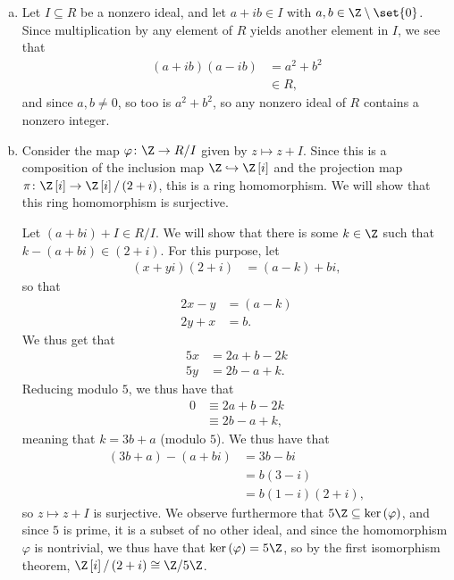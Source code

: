 \documentclass[10pt]{mypackage}
\begin{document}
\begin{solution}\hfill
  \begin{enumerate}[(a)]
    \item Let $I\subseteq R$ be a nonzero ideal, and let $a + ib\in I$ with $a,b\in \Z\setminus\set{0}$. Since multiplication by any element of $R$ yields another element in $I$, we see that
      \begin{align*}
        \left( a + ib \right)\left( a-ib \right) &= a^2 + b^2\\
                                                 &\in R,
      \end{align*}
      and since $a,b\neq 0$, so too is $a^2 + b^2$, so any nonzero ideal of $R$ contains a nonzero integer.
    \item Consider the map $\varphi\colon \Z\rightarrow R/I$ given by $z\mapsto z + I$. Since this is a composition of the inclusion map $\Z\hookrightarrow \Z\left[ i \right]$ and the projection map $\pi\colon \Z\left[ i \right]\rightarrow \Z\left[ i \right]/\left( 2+i \right)$, this is a ring homomorphism. We will show that this ring homomorphism is surjective.\newline

      Let $\left( a + bi \right) + I\in R/I$. We will show that there is some $k\in \Z$ such that $k - \left( a + bi \right) \in \left( 2 + i \right)$. For this purpose, let
      \begin{align*}
        \left( x + yi \right)\left( 2+i \right) &= \left( a-k \right) + bi,
      \end{align*}
      so that
      \begin{align*}
        2x - y &= \left( a-k \right)\\
        2y  + x &= b.
      \end{align*}
      We thus get that
      \begin{align*}
        5x &= 2a + b - 2k\\
        5y &= 2b - a + k.
      \end{align*}
      Reducing modulo $5$, we thus have that
      \begin{align*}
        0 &\equiv 2a + b - 2k\\
          &\equiv 2b - a + k,
      \end{align*}
      meaning that $k = 3b + a$ (modulo $5$). We thus have that
      \begin{align*}
        \left( 3b + a \right) - \left( a + bi \right) &= 3b - bi\\
                                                      &= b\left( 3-i \right)\\
                                                      &= b\left( 1-i \right)\left( 2+i \right),
      \end{align*}
      so $z\mapsto z + I$ is surjective. We observe furthermore that $5\Z\subseteq \ker\left( \varphi \right)$, and since $5$ is prime, it is a subset of no other ideal, and since the homomorphism $\varphi$ is nontrivial, we thus have that $\ker\left( \varphi \right) = 5\Z$, so by the first isomorphism theorem, $\Z\left[ i \right]/\left( 2+i \right) \cong \Z/5\Z$.
  \end{enumerate}
\end{solution}
\end{document}
